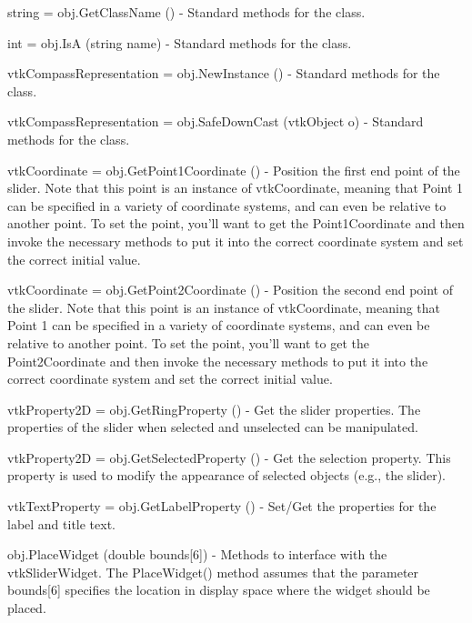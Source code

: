 \begin{DoxyItemize}
\item {\ttfamily string = obj.\-Get\-Class\-Name ()} -\/ Standard methods for the class.  
\item {\ttfamily int = obj.\-Is\-A (string name)} -\/ Standard methods for the class.  
\item {\ttfamily vtk\-Compass\-Representation = obj.\-New\-Instance ()} -\/ Standard methods for the class.  
\item {\ttfamily vtk\-Compass\-Representation = obj.\-Safe\-Down\-Cast (vtk\-Object o)} -\/ Standard methods for the class.  
\item {\ttfamily vtk\-Coordinate = obj.\-Get\-Point1\-Coordinate ()} -\/ Position the first end point of the slider. Note that this point is an instance of vtk\-Coordinate, meaning that Point 1 can be specified in a variety of coordinate systems, and can even be relative to another point. To set the point, you'll want to get the Point1\-Coordinate and then invoke the necessary methods to put it into the correct coordinate system and set the correct initial value.  
\item {\ttfamily vtk\-Coordinate = obj.\-Get\-Point2\-Coordinate ()} -\/ Position the second end point of the slider. Note that this point is an instance of vtk\-Coordinate, meaning that Point 1 can be specified in a variety of coordinate systems, and can even be relative to another point. To set the point, you'll want to get the Point2\-Coordinate and then invoke the necessary methods to put it into the correct coordinate system and set the correct initial value.  
\item {\ttfamily vtk\-Property2\-D = obj.\-Get\-Ring\-Property ()} -\/ Get the slider properties. The properties of the slider when selected and unselected can be manipulated.  
\item {\ttfamily vtk\-Property2\-D = obj.\-Get\-Selected\-Property ()} -\/ Get the selection property. This property is used to modify the appearance of selected objects (e.\-g., the slider).  
\item {\ttfamily vtk\-Text\-Property = obj.\-Get\-Label\-Property ()} -\/ Set/\-Get the properties for the label and title text.  
\item {\ttfamily obj.\-Place\-Widget (double bounds\mbox{[}6\mbox{]})} -\/ Methods to interface with the vtk\-Slider\-Widget. The Place\-Widget() method assumes that the parameter bounds\mbox{[}6\mbox{]} specifies the location in display space where the widget should be placed.  

\end{DoxyItemize}
